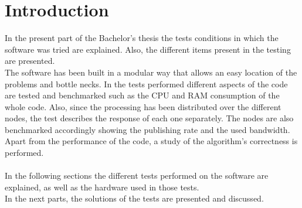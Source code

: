\section{Introduction}

In the present part of the Bachelor's thesis the tests conditions in which the software was tried are explained. Also, the different items present in the testing are presented. \\

The software has been built in a modular way that allows an easy location of the problems and bottle necks.
In the tests performed different aspects of the code are tested and benchmarked such as the CPU and RAM consumption of the whole code. Also, since the processing has been distributed over the different nodes, the test describes the response of each one separately. 
The nodes are also benchmarked accordingly showing the publishing rate and the used bandwidth. 
Apart from the performance of the code, a study of the algorithm's correctness is performed. 
\\


\\

In the following sections the different tests performed on the software are explained, as well as the hardware used in those tests. 
\\

In the next parts, the solutions of the tests are presented and discussed. 